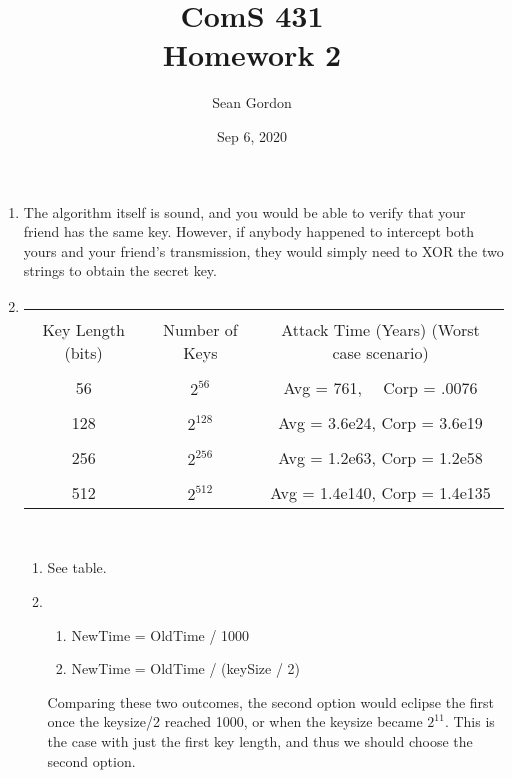 \documentclass[12pt]{article}
\title{ComS 431\\Homework 2}
\author{Sean Gordon}
\date{Sep 6, 2020}
\begin{document}
\maketitle


 \begin{enumerate}
   \item The algorithm itself is sound, and you would be able to verify that your friend has the same key. However, if anybody happened to intercept both yours and your friend's transmission, they would simply need to XOR the two strings to obtain the secret key.\\
   
   \item 
\begin{tabular}{|c|c|c|}
 \hline &&\\[-1em]
 Key Length (bits) & Number of Keys & Attack Time (Years) (Worst case scenario) \\
 \hline &&\\[-1em]
56 & $2^{56}$ & Avg = 761, \ \ Corp = .0076 \\
 \hline &&\\[-1em]
128 & $2^{128}$ & Avg = 3.6e24, Corp = 3.6e19 \\
 \hline &&\\[-1em]
 256 & $2^{256}$ & Avg = 1.2e63, Corp = 1.2e58 \\
 \hline &&\\[-1em]
 512 & $2^{512}$ & Avg = 1.4e140, Corp = 1.4e135 \\
 \hline
\end{tabular}\\

    \begin{enumerate}
    \item See table.
        
     \item \
         \begin{enumerate}
         \item NewTime = OldTime / 1000
         \item NewTime = OldTime / (keySize / 2)
         \end{enumerate}
         Comparing these two outcomes, the second option would eclipse the first once the keysize/2 reached 1000, or when the keysize became $2^{11}$. This is the case with just the first key length, and thus we should choose the second option.
    \end{enumerate}
\end{enumerate}
\end{document}
